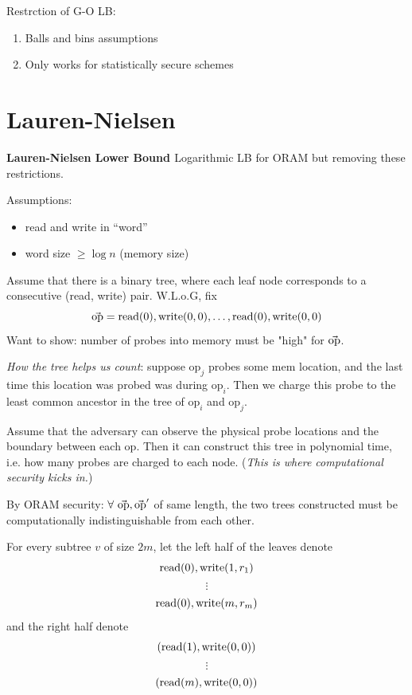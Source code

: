 {{\noindent Restrction of G-O LB:
\begin{enumerate}
  \item Balls and bins assumptions
  \item Only works for statistically secure schemes
\end{enumerate}
}

\section{Lauren-Nielsen}

\textbf{Lauren-Nielsen Lower Bound \cite{larsen18lowerbound}} Logarithmic LB for ORAM but removing these restrictions.

\noindent Assumptions:
\begin{itemize}
  \item read and write in ``word''
  \item word size $\geq \log n$ (memory size)
\end{itemize}

Assume that there is a binary tree, where each leaf node corresponds to a consecutive (read, write) pair. W.L.o.G, fix 
$$\vec{\mbox{op}} = \mbox{read}(0), \mbox{write}(0, 0), \dots, \mbox{read}(0), \mbox{write}(0, 0)$$
Want to show: number of probes into memory must be "high" for $\vec{\mbox{op}}$.

\noindent \emph{How the tree helps us count}: suppose $\mbox{op}_j$ probes some mem location, and the last time this location was probed was during $\mbox{op}_i$. Then we charge this probe to the least common ancestor in the tree of $\mbox{op}_i$ and $\mbox{op}_j$.


Assume that the adversary can observe the physical probe locations and the boundary between each $\mbox{op}$. Then it can construct this tree in polynomial time, i.e. how many probes are charged to each node. (\emph{This is where computational security kicks in.})

By ORAM security: $\forall\ \vec{\mbox{op}}, \vec{\mbox{op}}'$ of same length, the two trees constructed must be computationally indistinguishable from each other.

For every subtree $v$ of size $2m$, let the left half of the leaves denote
$$\mbox{read}(0), \mbox{write}(1, r_1)$$
$$\vdots$$
$$\mbox{read}(0), \mbox{write}(m, r_m)$$
and the right half denote
$$(\mbox{read}(1), \mbox{write}(0, 0))$$
$$\vdots$$
$$(\mbox{read}(m), \mbox{write}(0, 0))$$

}
